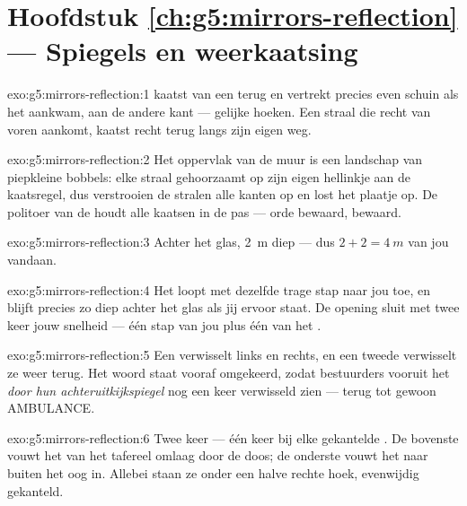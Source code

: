 \section*{Hoofdstuk \ref{ch:g5:mirrors-reflection} --- Spiegels en weerkaatsing}

\begin{solution}{exo:g5:mirrors-reflection:1}
 kaatst van een  terug en vertrekt precies even schuin
als het aankwam, aan de andere kant --- gelijke hoeken. Een straal die
recht van voren aankomt, kaatst recht terug langs zijn eigen weg.
\end{solution}

\begin{solution}{exo:g5:mirrors-reflection:2}
Het oppervlak van de muur is een landschap van piepkleine bobbels:
elke straal gehoorzaamt op zijn eigen hellinkje aan de kaatsregel, dus
verstrooien de stralen alle kanten op en lost het plaatje op. De
politoer van de  houdt alle kaatsen in de pas --- orde bewaard,
 bewaard.
\end{solution}

\begin{solution}{exo:g5:mirrors-reflection:3}
Achter het glas, \qty{2}{m} diep --- dus $2 + 2 = \qty{4}{m}$ van jou
vandaan.
\end{solution}

\begin{solution}{exo:g5:mirrors-reflection:4}
Het  loopt met dezelfde trage stap naar jou toe, en blijft
precies zo diep achter het glas als jij ervoor staat. De opening
sluit met twee keer jouw snelheid --- één stap van jou plus één van
het .
\end{solution}

\begin{solution}{exo:g5:mirrors-reflection:5}
Een  verwisselt links en rechts, en een tweede
 verwisselt ze weer terug. Het woord staat vooraf omgekeerd,
zodat bestuurders vooruit het \emph{door hun
achteruitkijkspiegel} nog een keer verwisseld zien --- terug tot
gewoon AMBULANCE.
\end{solution}

\begin{solution}{exo:g5:mirrors-reflection:6}
Twee keer --- één keer bij elke gekantelde . De bovenste
 vouwt het  van het tafereel omlaag door de doos; de
onderste vouwt het naar buiten het oog in. Allebei staan ze onder een
halve rechte hoek, evenwijdig gekanteld.
\end{solution}

